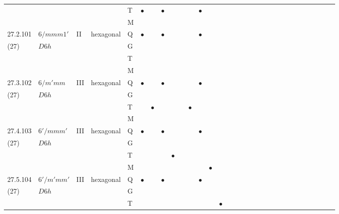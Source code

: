 \documentclass[fleqn,9pt,landscape]{jsarticle}
\begin{document}
\begin{longtable}{lllll|l|l|l|l|l|l|l|l|l|ll|ll|ll|ll|ll|ll|ll|ll}
 &  &  &  & T & $\bullet$ &  & $\bullet$ &  &  &  & $\bullet$ &  &  &  &  &  &  &  &  &  &  &  &  &  &  &  &  &  &  \\
 &  &  &  & M &  &  &  &  &  &  &  &  &  &  &  &  &  &  &  &  &  &  &  &  &  &  &  &  &  \\ \hline
27.2.101 & \texttt{$6/mmm1'$} & II & hexagonal & Q & $\bullet$ &  & $\bullet$ &  &  &  & $\bullet$ &  &  &  &  &  &  &  &  &  &  &  &  &  &  &  &  &  &  \\
(27) & $D6h$ &  &  & G &  &  &  &  &  &  &  &  &  &  &  &  &  &  &  &  &  &  &  &  &  &  &  &  &  \\
 &  &  &  & T &  &  &  &  &  &  &  &  &  &  &  &  &  &  &  &  &  &  &  &  &  &  &  &  &  \\
 &  &  &  & M &  &  &  &  &  &  &  &  &  &  &  &  &  &  &  &  &  &  &  &  &  &  &  &  &  \\ \hline
27.3.102 & \texttt{$6/m'mm$} & III & hexagonal & Q & $\bullet$ &  & $\bullet$ &  &  &  & $\bullet$ &  &  &  &  &  &  &  &  &  &  &  &  &  &  &  &  &  &  \\
(27) & $D6h$ &  &  & G &  &  &  &  &  &  &  &  &  &  &  &  &  &  &  &  &  &  &  &  &  &  &  &  &  \\
 &  &  &  & T &  & $\bullet$ &  &  &  & $\bullet$ &  &  &  &  &  &  &  &  &  &  &  &  &  &  &  &  &  &  &  \\
 &  &  &  & M &  &  &  &  &  &  &  &  &  &  &  &  &  &  &  &  &  &  &  &  &  &  &  &  &  \\ \hline
27.4.103 & \texttt{$6'/mmm'$} & III & hexagonal & Q & $\bullet$ &  & $\bullet$ &  &  &  & $\bullet$ &  &  &  &  &  &  &  &  &  &  &  &  &  &  &  &  &  &  \\
(27) & $D6h$ &  &  & G &  &  &  &  &  &  &  &  &  &  &  &  &  &  &  &  &  &  &  &  &  &  &  &  &  \\
 &  &  &  & T &  &  &  & $\bullet$ &  &  &  &  &  &  &  &  &  &  &  &  &  &  &  &  &  &  &  &  &  \\
 &  &  &  & M &  &  &  &  &  &  &  & $\bullet$ &  &  &  &  &  &  &  &  &  &  &  &  &  &  &  &  &  \\ \hline
27.5.104 & \texttt{$6'/m'mm'$} & III & hexagonal & Q & $\bullet$ &  & $\bullet$ &  &  &  & $\bullet$ &  &  &  &  &  &  &  &  &  &  &  &  &  &  &  &  &  &  \\
(27) & $D6h$ &  &  & G &  &  &  &  &  &  &  &  &  &  &  &  &  &  &  &  &  &  &  &  &  &  &  &  &  \\
 &  &  &  & T &  &  &  &  &  &  &  &  & $\bullet$ &  &  &  &  &  &  &  &  &  &  &  &  &  &  &  &  \\

\end{longtable}
\end{document}
